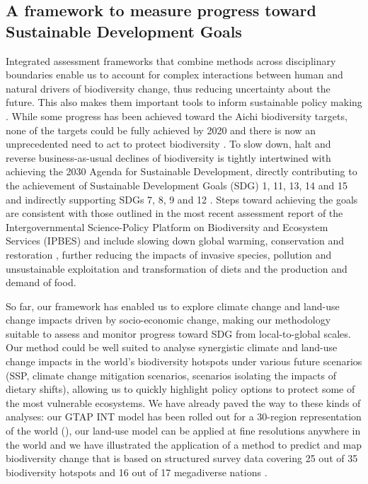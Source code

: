 \subsection{A framework to measure progress toward Sustainable Development Goals}

Integrated assessment frameworks that combine methods across disciplinary boundaries enable us to account for complex interactions between human and natural drivers of biodiversity change, thus reducing uncertainty about the future. This also makes them important tools to inform sustainable policy making \citep{veerkamp_future_2020, ipbes_summary_2019, un_general_assembly_transforming_2015}.
While some progress has been achieved toward the Aichi biodiversity targets, none of the targets could be fully achieved by 2020 and there is now an unprecedented need to act to protect biodiversity \citep{scbd_global_2020}. To slow down, halt and reverse business-as-usual declines of biodiversity is tightly intertwined with achieving the 2030 Agenda for Sustainable Development, directly contributing to the achievement of Sustainable Development Goals (SDG) 1, 11, 13, 14 and 15 and indirectly supporting SDGs 7, 8, 9 and 12 \citep{un_general_assembly_transforming_2015, scbd_global_2020}. Steps toward achieving the goals are consistent with those outlined in the most recent assessment report of the Intergovernmental Science-Policy Platform on Biodiversity and Ecosystem Services (IPBES) \citep{ipbes_summary_2019} and include slowing down global warming, conservation and restoration \citep[see also the current UN Decade on Ecosystem Restoration,][]{unep_resolution_2019}, further reducing the impacts of invasive species, pollution and unsustainable exploitation and transformation of diets and the production and demand of food. 

So far, our framework has enabled us to explore climate change and land-use change impacts driven by socio-economic change, making our methodology suitable to assess and monitor progress toward SDG from local-to-global scales. Our method could be well suited to analyse synergistic climate and land-use change impacts in the world's biodiversity hotspots under various future scenarios (SSP, climate change mitigation scenarios, scenarios isolating the impacts of dietary shifts), allowing us to quickly highlight policy options to protect some of the most vulnerable ecosystems. We have already paved the way to these kinds of analyses: our GTAP INT model has been rolled out for a 30-region representation of the world (), our land-use model can be applied at fine resolutions anywhere in the world and we have illustrated the application of a method to predict and map biodiversity change that is based on structured survey data covering 25 out of 35 biodiversity hotspots and 16 out of 17 megadiverse nations \citep{hudson_predicts_2014}.


